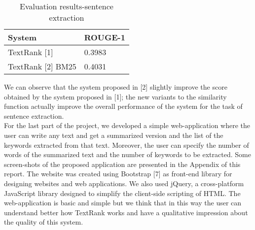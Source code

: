 \documentclass[twoside,twocolumn]{article}
\begin{document}
\begin{table}[t]
  \centering
  \begin{tabular}{| l  l |}
  \hline
    \textbf{System} & \textbf{ROUGE-1} \\ \hline
    TextRank [1] & 0.3983 \\ \hline
    TextRank [2] BM25 & 0.4031 \\ \hline
  \end{tabular}
  \caption{Evaluation results-sentence extraction}
  \label{tab:2}
\end{table}

We can observe that the system proposed in [2] slightly improve the score obtained by the system proposed in [1]; the new variants to the similarity function actually improve the overall performance of the system for the task of sentence extraction.\\
For the last part of the project, we developed a simple web-application where the user can write any text and get a summarized version and the list of the keywords extracted from that text. Moreover, the user can specify the number of words of the summarized text and the number of keywords to be extracted. Some screen-shots of the proposed application are presented in the Appendix of this report. The website was created using Bootstrap [7] as front-end library for designing websites and web applications. We also used jQuery, a cross-platform JavaScript library designed to simplify the client-side scripting of HTML. The web-application is basic and simple but we think that in this way the user can understand better how TextRank works and have a qualitative impression about the quality of this system.
\end{document}
